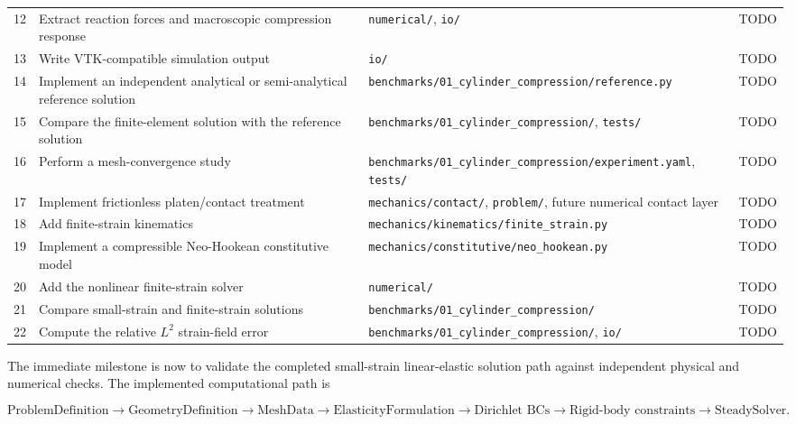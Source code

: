 \begin{longtable}{p{}p{}p{}p{}}
12 &
Extract reaction forces and macroscopic compression response &
\texttt{numerical/},
\texttt{io/} &
TODO \\

13 &
Write VTK-compatible simulation output &
\texttt{io/} &
TODO \\

14 &
Implement an independent analytical or semi-analytical reference solution &
\texttt{benchmarks/01\_cylinder\_compression/reference.py} &
TODO \\

15 &
Compare the finite-element solution with the reference solution &
\texttt{benchmarks/01\_cylinder\_compression/},
\texttt{tests/} &
TODO \\

16 &
Perform a mesh-convergence study &
\texttt{benchmarks/01\_cylinder\_compression/experiment.yaml},
\texttt{tests/} &
TODO \\

17 &
Implement frictionless platen/contact treatment &
\texttt{mechanics/contact/},
\texttt{problem/},
future numerical contact layer &
TODO \\

18 &
Add finite-strain kinematics &
\texttt{mechanics/kinematics/finite\_strain.py} &
TODO \\

19 &
Implement a compressible Neo-Hookean constitutive model &
\texttt{mechanics/constitutive/neo\_hookean.py} &
TODO \\

20 &
Add the nonlinear finite-strain solver &
\texttt{numerical/} &
TODO \\

21 &
Compare small-strain and finite-strain solutions &
\texttt{benchmarks/01\_cylinder\_compression/} &
TODO \\

22 &
Compute the relative $L^2$ strain-field error &
\texttt{benchmarks/01\_cylinder\_compression/},
\texttt{io/} &
TODO \\

\bottomrule
\end{longtable}

The immediate milestone is now to validate the completed small-strain
linear-elastic solution path against independent physical and numerical
checks. The implemented computational path is

$$
\text{ProblemDefinition}
\rightarrow
\text{GeometryDefinition}
\rightarrow
\text{MeshData}
\rightarrow
\text{ElasticityFormulation}
\rightarrow
\text{Dirichlet BCs}
\rightarrow
\text{Rigid-body constraints}
\rightarrow
\text{SteadySolver}.
$$

